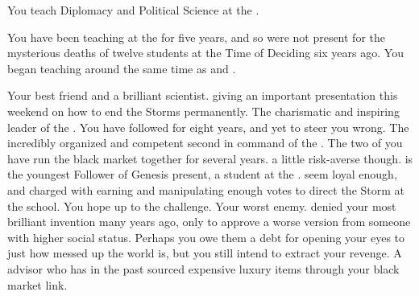 \documentclass[char]{GL2020}
\begin{document}
\begin{itemz}[Notes]
	\item You teach Diplomacy and Political Science at the \pSchool{}.
	\item You have been teaching at the \pSc{} for five years, and so were not present for the mysterious deaths of twelve students at the Time of Deciding six years ago. You began teaching around the same time as \cPrince{}  and \cChupSecond{}.
\end{itemz}

\begin{contacts}
	\contact{\cHeadScientist{}} Your best friend and a brilliant scientist. \cHeadScientist{\They} \cHeadScientist{\are} giving an important presentation this weekend on how to end the Storms permanently.
	\contact{\cChupLeader{}} The charismatic and inspiring leader of the \pGoaties{}. You have followed \cChupLeader{\them} for eight years, and \cChupLeader{\they} \cChupLeader{\have} yet to steer you wrong.
	\contact{\cChupSecond{}} The incredibly organized and competent second in command of the \pGoaties{}. The two of you have run the black market together for several years. \cChupSecond{\Theyare} a little risk-averse though.
	\contact{\cChupStudent{}} is the youngest Follower of Genesis present, a student at the \pSc{}. \cChupStudent{\They} seem\cChupStudent{\plural} loyal enough, and \cChupStudent{\are} charged with earning and manipulating enough votes to direct the Storm at the school. You hope \cChupStudent{\theyare} up to the challenge.
	\contact{\cAntiChup{}} Your worst enemy. \cAntiChup{\They} denied your most brilliant invention many years ago, only to approve a worse version from someone with higher social status. Perhaps you owe them a debt for opening your eyes to just how messed up the world is, but you still intend to extract your revenge.
\contact{\cHedonist{}} A \pFarm{} advisor who has in the past sourced expensive luxury items through your black market link.
\end{contacts}
\end{document}
